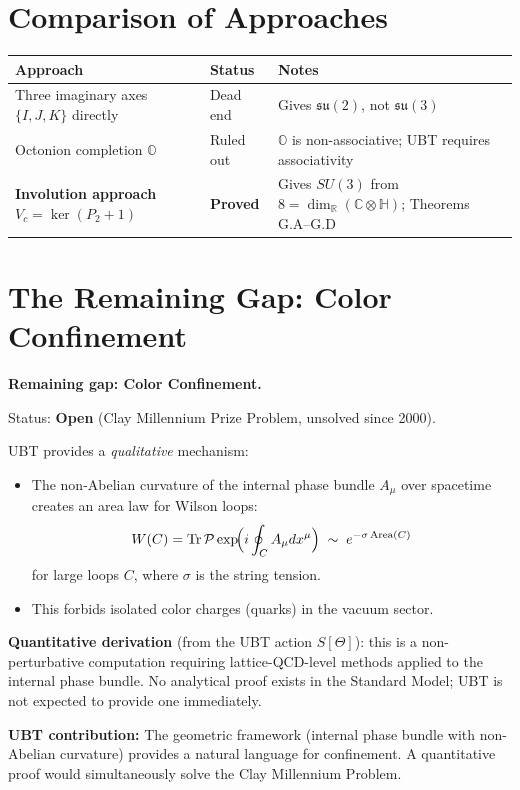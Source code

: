 \documentclass[12pt,a4paper]{article}
\theoremstyle{definition}
\theoremstyle{remark}
\begin{document}
\section{Comparison of Approaches}
\label{sec:comparison}

\begin{center}
\begin{tabular}{p{3.5cm}lp{5cm}}
  \toprule
  \textbf{Approach} & \textbf{Status} & \textbf{Notes} \\
  \midrule
  Three imaginary axes $\{I,J,K\}$ directly
    & Dead end
    & Gives $\mathfrak{su}(2)$, not $\mathfrak{su}(3)$ \\
  Octonion completion $\mathbb{O}$
    & Ruled out
    & $\mathbb{O}$ is non-associative; UBT requires associativity \\
  \textbf{Involution approach}
  $V_c = \ker(P_2+1)$
    & \textbf{Proved}
    & Gives $SU(3)$ from $8 = \dim_\mathbb{R}(\mathbb{C}\otimes\mathbb{H})$;
      Theorems G.A--G.D \\
  \bottomrule
\end{tabular}
\end{center}

\section{The Remaining Gap: Color Confinement}
\label{sec:confinement}

\begin{gapbox}
\textbf{Remaining gap: Color Confinement.}

Status: \textbf{Open} (Clay Millennium Prize Problem, unsolved since 2000).

UBT provides a \emph{qualitative} mechanism:
\begin{itemize}
  \item The non-Abelian curvature of the internal phase bundle $A_\mu$
        over spacetime creates an area law for Wilson loops:
        \[W(C) = \mathrm{Tr}\,\mathcal{P}\exp\!\Bigl(i\oint_C A_\mu dx^\mu\Bigr)
          \;\sim\; e^{-\sigma\,\mathrm{Area}(C)}\]
        for large loops $C$, where $\sigma$ is the string tension.
  \item This forbids isolated color charges (quarks) in the vacuum sector.
\end{itemize}

\textbf{Quantitative derivation} (from the UBT action $S[\Theta]$):
this is a non-perturbative computation requiring lattice-QCD-level
methods applied to the internal phase bundle.  No analytical proof
exists in the Standard Model; UBT is not expected to provide one
immediately.

\textbf{UBT contribution:} The geometric framework (internal phase bundle
with non-Abelian curvature) provides a natural language for confinement.
A quantitative proof would simultaneously solve the Clay Millennium Problem.
\end{gapbox}
\end{document}
